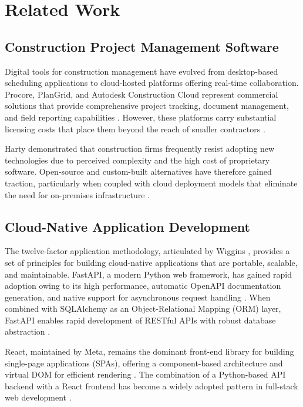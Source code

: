 \documentclass[conference]{IEEEtran}
\begin{document}
\section{Related Work}
\label{sec:related_work}

\subsection{Construction Project Management Software}

Digital tools for construction management have evolved from desktop-based scheduling applications to cloud-hosted platforms offering real-time collaboration. Procore, PlanGrid, and Autodesk Construction Cloud represent commercial solutions that provide comprehensive project tracking, document management, and field reporting capabilities \cite{sacks2018bim}. However, these platforms carry substantial licensing costs that place them beyond the reach of smaller contractors \cite{omar2018challenges}.

Harty \cite{harty2005innovation} demonstrated that construction firms frequently resist adopting new technologies due to perceived complexity and the high cost of proprietary software. Open-source and custom-built alternatives have therefore gained traction, particularly when coupled with cloud deployment models that eliminate the need for on-premises infrastructure \cite{jha2017cloud}.

\subsection{Cloud-Native Application Development}

The twelve-factor application methodology, articulated by Wiggins \cite{wiggins2017twelve}, provides a set of principles for building cloud-native applications that are portable, scalable, and maintainable. FastAPI, a modern Python web framework, has gained rapid adoption owing to its high performance, automatic OpenAPI documentation generation, and native support for asynchronous request handling \cite{ramirez2024fastapi}. When combined with SQLAlchemy as an Object-Relational Mapping (ORM) layer, FastAPI enables rapid development of RESTful APIs with robust database abstraction \cite{bayer2012sqlalchemy}.

React, maintained by Meta, remains the dominant front-end library for building single-page applications (SPAs), offering a component-based architecture and virtual DOM for efficient rendering \cite{gackenheimer2015react}. The combination of a Python-based API backend with a React frontend has become a widely adopted pattern in full-stack web development \cite{banks2014fullstack}.
\end{document}
